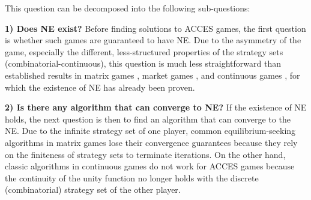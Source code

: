 This question can be decomposed into the following sub-questions: 

\textbf{1) Does NE exist?} Before finding solutions to ACCES games, the first question is whether such games are guaranteed to have NE. Due to the asymmetry of the game, especially the different, less-structured properties of the strategy sets (combinatorial-continuous), this question is much less straightforward than established results in matrix games \citep{nash1950non}, market games \citep{peck1992market}, and continuous games \citep{glicksberg1952further, fan1952fixed, reny2005non}, for which the existence of NE has already been proven.



\textbf{2) Is there any algorithm that can converge to NE?} If the existence of NE holds, the next question is then to find an algorithm that can converge to the NE. 
Due to the infinite strategy set of one player, common equilibrium-seeking algorithms \citep{mcmahan2003planning, dinh2022online} in matrix games lose their convergence guarantees because they rely on the finiteness of strategy sets to terminate iterations. On the other hand, classic algorithms in continuous games \citep{balandat2016minimizing, Adam2021DOcontin} do not work for ACCES games because the continuity of the unity function no longer holds with the discrete (combinatorial) strategy set of the other player.

